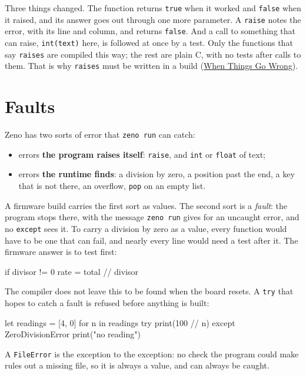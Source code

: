 Three things changed. The function returns \verb|true| when it worked
and \verb|false| when it raised, and its answer goes out through one
more parameter. A \verb|raise| notes the error, with its line and
column, and returns \verb|false|. And a call to something that can
raise, \verb|int(text)| here, is followed at once by a test. Only the
functions that say \verb|raises| are compiled this way; the rest are
plain C, with no tests after calls to them. That is why \verb|raises|
must be written in a build (\hyperref[ch-errors]{When Things Go Wrong}).

\section{Faults}

Zeno has two sorts of error that \verb|zeno run| can catch:

\begin{itemize}
\item errors \textbf{the program raises itself}: \verb|raise|, and
  \verb|int| or \verb|float| of text;
\item errors \textbf{the runtime finds}: a division by zero, a position
  past the end, a key that is not there, an overflow, \verb|pop| on an
  empty list.
\end{itemize}

A firmware build carries the first sort as values. The second sort is
a \emph{fault}: the program stops there, with the message \verb|zeno run|
gives for an uncaught error, and no \verb|except| sees it. To carry a
division by zero as a value, every function would have to be one that
can fail, and nearly every line would need a test after it. The
firmware answer is to test first:

\begin{zenofrag}
if divisor != 0 {
    rate = total // divisor
}
\end{zenofrag}

The compiler does not leave this to be found when the board resets. A
\verb|try| that hopes to catch a fault is refused before anything is
built:

\begin{zeno}[file=divide.zeno, cmd=zeno build --firmware {file}, fails=yes]
let readings = [4, 0]
for n in readings {
    try {
        print(100 // n)
    } except ZeroDivisionError {
        print("no reading")
    }
}
\end{zeno}

A \verb|FileError| is the exception to the exception: no check the
program could make rules out a missing file, so it is always a value,
and can always be caught.

